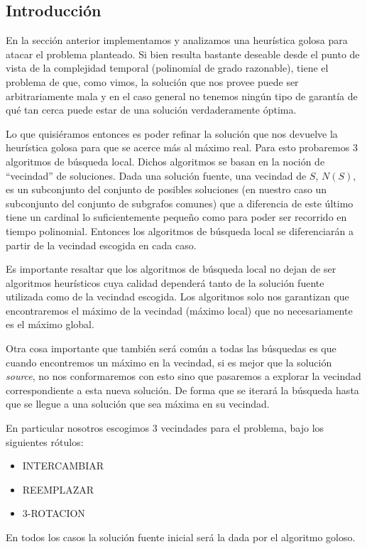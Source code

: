\subsection{Introducción}
En la sección anterior implementamos y analizamos una heurística golosa para atacar el problema planteado. Si bien resulta bastante deseable desde el punto de vista de la complejidad temporal (polinomial de grado razonable), tiene el problema de que, como vimos, la solución que nos provee puede ser arbitrariamente mala y en el caso general no tenemos ningún tipo de garantía de qué tan cerca puede estar de una solución verdaderamente óptima.

Lo que quisiéramos entonces es poder refinar la solución que nos devuelve la heurística golosa para que se acerce más al máximo real. Para esto probaremos 3 algoritmos de búsqueda local. Dichos algoritmos se basan en la noción de ``vecindad'' de soluciones. Dada una solución fuente, una vecindad de $S$, $N(S)$, es un subconjunto del conjunto de posibles soluciones (en nuestro caso un subconjunto del conjunto de subgrafos comunes) que a diferencia de este último tiene un cardinal lo suficientemente pequeño como para poder ser recorrido en tiempo polinomial. Entonces los algoritmos de búsqueda local se diferenciarán a partir de la vecindad escogida en cada caso.

Es importante resaltar que los algoritmos de búsqueda local no dejan de ser algoritmos heurísticos cuya calidad dependerá tanto de la solución fuente utilizada como de la vecindad escogida. Los algoritmos solo nos garantizan que encontraremos el máximo de la vecindad (máximo local) que no necesariamente es el máximo global.

Otra cosa importante que también será común a todas las búsquedas es que cuando encontremos un máximo en la vecindad, si es mejor que la solución \emph{source}, no nos conformaremos con esto sino que pasaremos a explorar la vecindad correspondiente a esta nueva solución. De forma que se iterará la búsqueda hasta que se llegue a una solución que sea máxima en su vecindad.

En particular nosotros escogimos 3 vecindades para el problema, bajo los siguientes rótulos:
\begin{itemize}
	\item INTERCAMBIAR
	\item REEMPLAZAR
	\item 3-ROTACION 
\end{itemize}

En todos los casos la solución fuente inicial será la dada por el algoritmo goloso.

